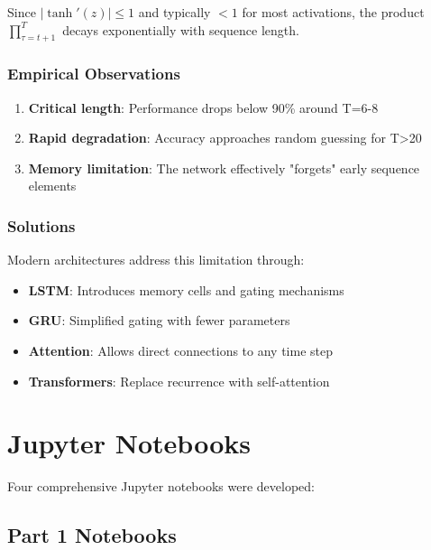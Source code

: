 \documentclass[11pt,a4paper]{article}
\begin{document}
Since $|\tanh'(z)| \leq 1$ and typically $<1$ for most activations, the product $\prod_{\tau=t+1}^{T}$ decays exponentially with sequence length.

\subsubsection{Empirical Observations}

\begin{enumerate}
    \item \textbf{Critical length}: Performance drops below 90\% around T=6-8
    \item \textbf{Rapid degradation}: Accuracy approaches random guessing for T>20
    \item \textbf{Memory limitation}: The network effectively "forgets" early sequence elements
\end{enumerate}

\subsubsection{Solutions}

Modern architectures address this limitation through:
\begin{itemize}
    \item \textbf{LSTM}: Introduces memory cells and gating mechanisms
    \item \textbf{GRU}: Simplified gating with fewer parameters
    \item \textbf{Attention}: Allows direct connections to any time step
    \item \textbf{Transformers}: Replace recurrence with self-attention
\end{itemize}

\section{Jupyter Notebooks}

Four comprehensive Jupyter notebooks were developed:

\subsection{Part 1 Notebooks}
\end{document}
